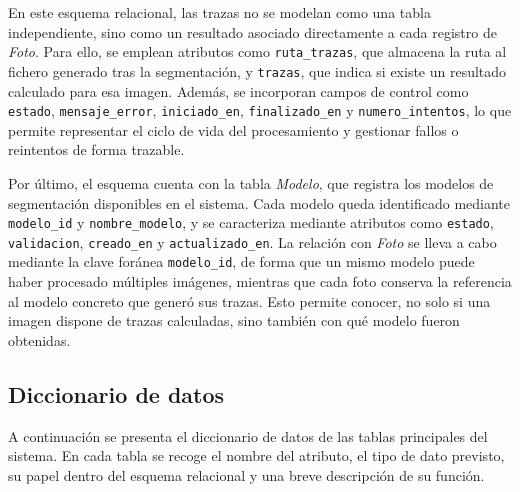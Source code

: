 En este esquema relacional, las trazas no se modelan como una tabla independiente, sino como un resultado asociado directamente a cada registro de \textit{Foto}. Para ello, se emplean atributos como \texttt{ruta\_trazas}, que almacena la ruta al fichero generado tras la segmentación, y \texttt{trazas}, que indica si existe un resultado calculado para esa imagen. Además, se incorporan campos de control como \texttt{estado}, \texttt{mensaje\_error}, \texttt{iniciado\_en}, \texttt{finalizado\_en} y \texttt{numero\_intentos}, lo que permite representar el ciclo de vida del procesamiento y gestionar fallos o reintentos de forma trazable.

Por último, el esquema cuenta con la tabla \textit{Modelo}, que registra los modelos de segmentación disponibles en el sistema. Cada modelo queda identificado mediante \texttt{modelo\_id} y \texttt{nombre\_modelo}, y se caracteriza mediante atributos como \texttt{estado}, \texttt{validacion}, \texttt{creado\_en} y \texttt{actualizado\_en}. La relación con \textit{Foto} se lleva a cabo mediante la clave foránea \texttt{modelo\_id}, de forma que un mismo modelo puede haber procesado múltiples imágenes, mientras que cada foto conserva la referencia al modelo concreto que generó sus trazas. Esto permite conocer, no solo si una imagen dispone de trazas calculadas, sino también con qué modelo fueron obtenidas. 

\subsection{Diccionario de datos}

A continuación se presenta el diccionario de datos de las tablas principales del sistema. En cada tabla se recoge el nombre del atributo, el tipo de dato previsto, su papel dentro del esquema relacional y una breve descripción de su función.

\begingroup
\small
\setlength{\tabcolsep}{3pt}
\renewcommand{\arraystretch}{1.25}

